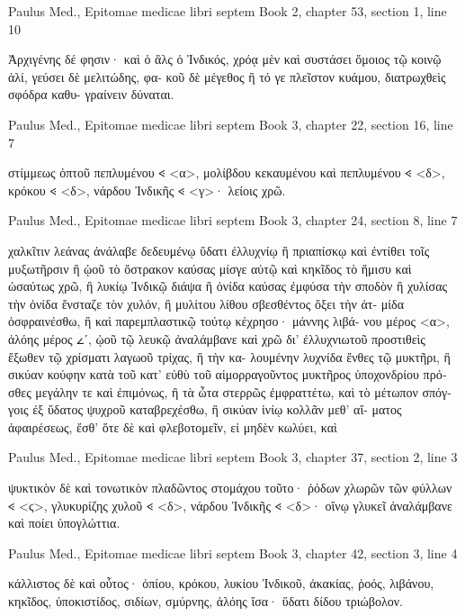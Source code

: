 \documentclass[12pt,letterpaper,twoside,final]{memoir}
\begin{document}
\begin{greek}

Paulus Med., Epitomae medicae libri septem 
Book 2, chapter 53, section 1, line 10

                            Ἀρχιγένης δέ φησιν· καὶ ὁ ἃλς ὁ Ἰνδικός, 
χρόᾳ μὲν καὶ συστάσει ὅμοιος τῷ κοινῷ ἁλί, γεύσει δὲ μελιτώδης, φα-
κοῦ δὲ μέγεθος ἢ τό γε πλεῖστον κυάμου, διατρωχθεὶς σφόδρα καθυ-
γραίνειν δύναται. 



Paulus Med., Epitomae medicae libri septem 
Book 3, chapter 22, section 16, line 7

          στίμμεως ὀπτοῦ πεπλυμένου 𐅻 <α>, μολίβδου κεκαυμένου καὶ 
πεπλυμένου 𐅻 <δ>, κρόκου 𐅻 <δ>, νάρδου Ἰνδικῆς 𐅻 <γ>· λείοις χρῶ. 



Paulus Med., Epitomae medicae libri septem 
Book 3, chapter 24, section 8, line 7

                                            χαλκῖτιν λεάνας ἀνάλαβε δεδευμένῳ 
ὕδατι ἐλλυχνίῳ ἢ πριαπίσκῳ καὶ ἐντίθει τοῖς μυξωτῆρσιν ἢ ᾠοῦ τὸ 
ὄστρακον καύσας μίσγε αὐτῷ καὶ κηκῖδος τὸ ἥμισυ καὶ ὡσαύτως χρῶ, 
ἢ λυκίῳ Ἰνδικῷ διάψα ἢ ὀνίδα καύσας ἐμφύσα τὴν σποδὸν ἢ χυλίσας 
τὴν ὀνίδα ἔνσταζε τὸν χυλόν, ἢ μυλίτου λίθου σβεσθέντος ὄξει τὴν ἀτ-
μίδα ὀσφραινέσθω, ἢ καὶ παρεμπλαστικῷ τούτῳ κέχρησο· μάννης λιβά-
νου μέρος <α>, ἀλόης μέρος 𐅵ʹ, ᾠοῦ τῷ λευκῷ ἀναλάμβανε καὶ χρῶ δι' 
ἐλλυχνιωτοῦ προστιθεὶς ἔξωθεν τῷ χρίσματι λαγωοῦ τρίχας, ἢ τὴν κα-
λουμένην λυχνίδα ἔνθες τῷ μυκτῆρι, ἢ σικύαν κούφην κατὰ τοῦ κατ' 
εὐθὺ τοῦ αἱμορραγοῦντος μυκτῆρος ὑποχονδρίου πρόσθες μεγάλην τε 
καὶ ἐπιμόνως, ἢ τὰ ὦτα στερρῶς ἐμφραττέτω, καὶ τὸ μέτωπον σπόγ-  
γοις ἐξ ὕδατος ψυχροῦ καταβρεχέσθω, ἢ σικύαν ἰνίῳ κολλᾶν μεθ' αἵ-
ματος ἀφαιρέσεως, ἔσθ' ὅτε δὲ καὶ φλεβοτομεῖν, εἰ μηδὲν κωλύει, καὶ 




Paulus Med., Epitomae medicae libri septem 
Book 3, chapter 37, section 2, line 3

                                                                       ψυκτικὸν 
δὲ καὶ τονωτικὸν πλαδῶντος στομάχου τοῦτο· ῥόδων χλωρῶν τῶν 
φύλλων 𐅻 <ϛ>, γλυκυρίζης χυλοῦ 𐅻 <δ>, νάρδου Ἰνδικῆς 𐅻 <δ>· οἴνῳ γλυκεῖ 
ἀναλάμβανε καὶ ποίει ὑπογλώττια. 



Paulus Med., Epitomae medicae libri septem 
Book 3, chapter 42, section 3, line 4

            κάλλιστος δὲ καὶ οὗτος· ὀπίου, κρόκου, λυκίου Ἰνδικοῦ, 
ἀκακίας, ῥοός, λιβάνου, κηκῖδος, ὑποκιστίδος, σιδίων, σμύρνης, ἀλόης 
ἴσα· ὕδατι δίδου τριώβολον. 




\end{greek}
\end{document}
